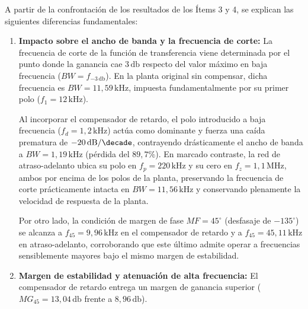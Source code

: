 A partir de la confrontación de los resultados de los Ítems 3 y 4, se explican las siguientes diferencias fundamentales:

\begin{enumerate}
    \item \textbf{Impacto sobre el ancho de banda y la frecuencia de corte:} La frecuencia de corte de la función de
    transferencia viene determinada por el punto donde la ganancia cae $3\,\si{\decibel}$ respecto del valor máximo en
    baja frecuencia ($BW = f_{-3\,\si{\decibel}}$). En la planta original sin compensar, dicha frecuencia es
    $BW = 11,59\,\si{\kilo\hertz}$, impuesta fundamentalmente por su primer polo ($f_1 = 12\,\si{\kilo\hertz}$).

    Al incorporar el compensador de retardo, el polo introducido a baja frecuencia ($f_d = 1,2\,\si{\kilo\hertz}$) actúa como
    dominante y fuerza una caída prematura de $-20\,\si{\decibel\per\decade}$, contrayendo drásticamente el ancho de banda a
    $BW = 1,19\,\si{\kilo\hertz}$ (pérdida del $89,7\%$). En marcado contraste, la red de atraso-adelanto ubica su polo en
    $f_p = 220\,\si{\kilo\hertz}$ y su cero en $f_z = 1,1\,\si{\mega\hertz}$, ambos por encima de los polos de la planta,
    preservando la frecuencia de corte prácticamente intacta en $BW = 11,56\,\si{\kilo\hertz}$ y conservando plenamente la
    velocidad de respuesta de la planta.

    Por otro lado, la condición de margen de fase $MF = 45^\circ$ (desfasaje de $-135^\circ$) se alcanza a $f_{45} = 9,96\,\si{\kilo\hertz}$
    en el compensador de retardo y a $f_{45} = 45,11\,\si{\kilo\hertz}$ en atraso-adelanto, corroborando que este último admite
    operar a frecuencias sensiblemente mayores bajo el mismo margen de estabilidad.

    \item \textbf{Margen de estabilidad y atenuación de alta frecuencia:} El compensador de retardo entrega un margen de ganancia
    superior ($MG_{45} = 13,04\,\si{\decibel}$ frente a $8,96\,\si{\decibel}$).

\end{enumerate}

